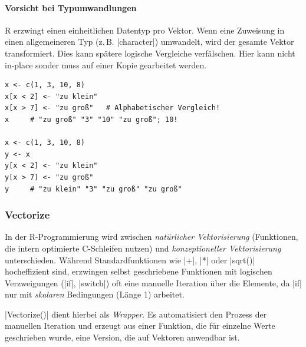 \documentclass[10pt,twocolumn]{scrartcl}
\renewcommand{\lstinline}{\mycoloredinline}
\begin{document}
\paragraph{Vorsicht bei Typumwandlungen}

R erzwingt einen einheitlichen Datentyp pro Vektor. Wenn eine Zuweisung in einen allgemeineren Typ (z.\,B. \lstinline|character|) umwandelt, wird der gesamte Vektor transformiert. Dies kann spätere logische Vergleiche verfälschen. Hier kann nicht in-place sonder muss auf einer Kopie gearbeitet werden.

\begin{lstlisting}
x <- c(1, 3, 10, 8)
x[x < 2] <- "zu klein"
x[x > 7] <- "zu groß"   # Alphabetischer Vergleich!
x     # "zu groß" "3" "10" "zu groß"; 10!

x <- c(1, 3, 10, 8)
y <- x
y[x < 2] <- "zu klein"
y[x > 7] <- "zu groß"
y     # "zu klein" "3" "zu groß" "zu groß"
\end{lstlisting}


\subsubsection{Vectorize}

In der R-Programmierung wird zwischen \emph{natürlicher Vektorisierung} (Funktionen, die intern optimierte C-Schleifen nutzen) und \emph{konzeptioneller Vektorisierung} unterschieden. Während Standardfunktionen wie \lstinline|+|, \lstinline|*| oder \lstinline|sqrt()| hocheffizient sind, erzwingen selbst geschriebene Funktionen mit logischen Verzweigungen (\lstinline|if|, \lstinline|switch|) oft eine manuelle Iteration über die Elemente, da \lstinline|if| nur mit \emph{skalaren} Bedingungen (Länge 1) arbeitet.

\lstinline|Vectorize()| dient hierbei als \emph{Wrapper}. Es automatisiert den Prozess der manuellen Iteration und erzeugt aus einer Funktion, die für einzelne Werte geschrieben wurde, eine Version, die auf Vektoren anwendbar ist.
\end{document}
